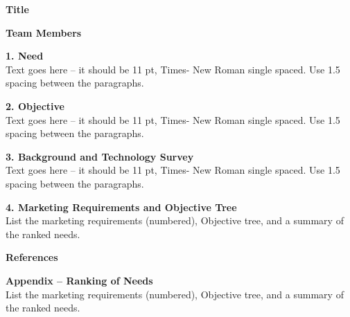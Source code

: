 \begin{enumerate}
\begin{onlysolution}
\textbf{Title}

\textbf{Team Members}

\textbf{1. Need}\\
Text goes here -- it should be 11 pt, Times- New Roman single spaced.
Use 1.5 spacing between the paragraphs.

\textbf{2. Objective}\\
Text goes here -- it should be 11 pt, Times- New Roman single spaced.
Use 1.5 spacing between the paragraphs.

\textbf{3. Background and Technology Survey}\\
Text goes here -- it should be 11 pt, Times- New Roman single spaced.
Use 1.5 spacing between the paragraphs.

\textbf{4. Marketing Requirements and Objective Tree}\\
List the marketing requirements (numbered), Objective tree, and a
summary of the ranked needs.

\textbf{References}

\textbf{Appendix -- Ranking of Needs}\\
List the marketing requirements (numbered), Objective tree, and a
summary of the ranked needs.
  \end{onlysolution}
\end{enumerate}
